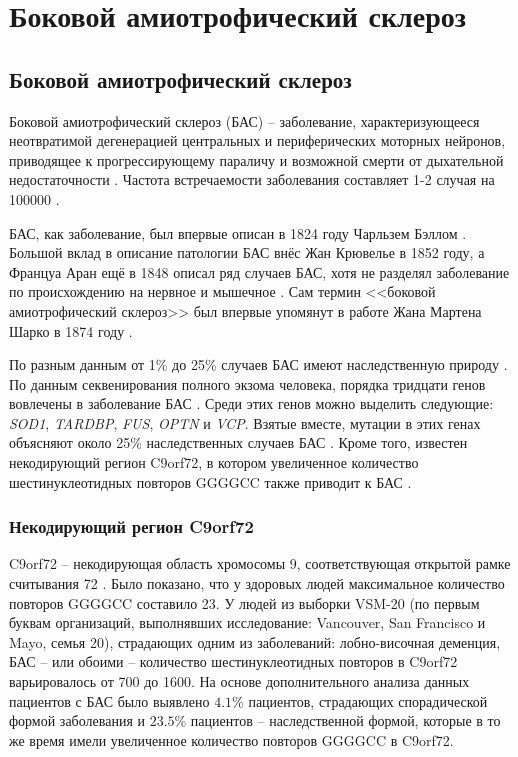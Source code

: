 \chapter{Боковой амиотрофический склероз} \label{chapt1}

\section{Боковой амиотрофический склероз} \label{sect_ALS}

Боковой амиотрофический склероз (БАС) -- заболевание, характеризующееся неотвратимой дегенерацией центральных и периферических моторных нейронов, приводящее к прогрессирующему параличу и возможной смерти от дыхательной недостаточности \cite{Alavi2013,Andersen2003,Drechsel2012,Haidet-Phillips2011}. Частота встречаемости заболевания составляет 1-2 случая на 100000 \cite{Alavi2013,Brotherton2012,Brown1997}.

БАС, как заболевание, был впервые описан в 1824 году Чарльзем Бэллом \cite{Rowland2001}. Большой вклад в описание патологии БАС внёс Жан Крювелье в 1852 году, а Француа Аран ещё в 1848 описал ряд случаев БАС, хотя не разделял заболевание по происхождению на нервное и мышечное \cite{Rowland2001, Marangi2015}. Сам термин <<боковой амиотрофический склероз>> был впервые упомянут в работе Жана Мартена Шарко в 1874 году \cite{Rowland2001}.

По разным данным от 1\% до 25\% случаев БАС имеют наследственную природу \cite{Abe1996,Alavi2013,Belzil2012,Eisen2008,Renton2011}. По данным секвенирования полного экзома человека, порядка тридцати генов вовлечены в заболевание БАС \cite{Cirulli2015}. Среди этих генов можно выделить следующие: \textit{SOD1}, \textit{TARDBP}, \textit{FUS}, \textit{OPTN} и \textit{VCP}. Взятые вместе, мутации в этих генах объясняют около 25\% наследственных случаев БАС \cite{Renton2011}. Кроме того, известен некодирующий регион C9orf72, в котором увеличенное количество шестинуклеотидных повторов GGGGCC также приводит к БАС \cite{Renton2011,DeJesus-Hernandez2011}.

\subsection{Некодирующий регион C9orf72} \label{subsect_C9orf72}

C9orf72 -- некодирующая область хромосомы 9, соответствующая открытой рамке считывания 72 \cite{DeJesus-Hernandez2011}. Было показано, что у здоровых людей максимальное количество повторов GGGGCC составило 23. У людей из выборки VSM-20 (по первым буквам организаций, выполнявших исследование: Vancouver, San Francisco и Mayo, семья 20), страдающих одним из заболеваний:  	лобно-височная деменция, БАС -- или обоими -- количество шестинуклеотидных повторов в C9orf72 варьировалось от 700 до 1600. На основе дополнительного анализа данных пациентов с БАС было выявлено $4.1$\% пациентов, страдающих спорадической формой заболевания и $23.5$\% пациентов -- наследственной формой, которые в то же время имели увеличенное количество повторов GGGGCC в C9orf72. 

